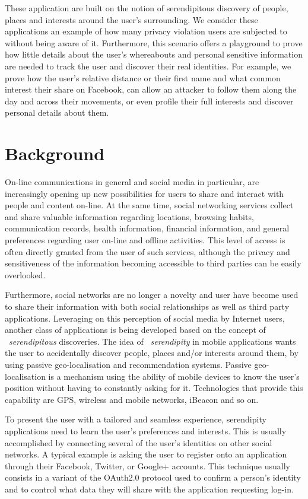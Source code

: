 These application are built on the notion of serendipitous discovery of people, places and interests around the user's surrounding.  We consider these applications an example of how many privacy violation users are subjected to without being aware of it. Furthermore, this scenario offers a playground to prove how little details about the user's whereabouts and personal sensitive information are needed to track the user and discover their real identities.  For example, we prove how the user's relative distance or their first name and what common interest their share on Facebook, can allow an attacker to follow them along the day and across their movements, or even profile their full interests and discover personal details about them.

\section{Background}
\noindent
On-line communications in general and social media in particular, are increasingly opening up new possibilities for users to share and interact with people and content on-line. At the same time, social networking services collect and share valuable information regarding locations, browsing habits, communication records, health information, financial information, and general preferences regarding user on-line and offline activities. This level of access is often directly granted from the user of such services, although the privacy and sensitiveness of the information becoming accessible to third parties can be easily overlooked.

Furthermore, social networks are no longer a novelty and user have become used to share their information with both social relationships as well as third party applications. Leveraging on this perception of social media by Internet users, another class of applications is being developed based on the concept of ~\emph{serendipitous} discoveries. The idea of ~\emph{serendipity} in mobile applications wants the user to accidentally discover people, places and/or interests around them, by using passive geo-localisation and recommendation systems. Passive geo-localisation is a mechanism using the ability of mobile devices to know the user's position without having to constantly asking for it. Technologies that provide this capability are GPS, wireless and mobile networks, iBeacon and so on.

To present the user with a tailored and seamless experience, serendipity applications need to learn the user's preferences and interests. This is usually accomplished by connecting several of the user's identities on other social networks. A typical example is asking the user to register onto an application through their Facebook, Twitter, or Google+ accounts. This technique usually consists in a variant of the OAuth2.0 protocol used to confirm a person's identity and to control what data they will share with the application requesting log-in.

